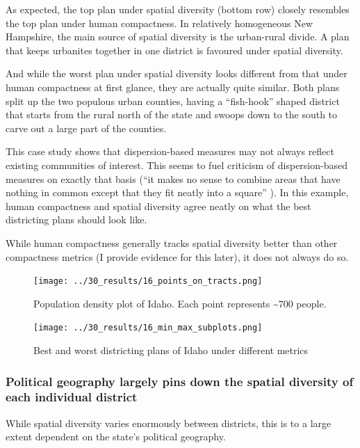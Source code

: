 \documentclass[]{article}
\begin{document}
As expected, the top plan under spatial diversity (bottom row) closely
resembles the top plan under human compactness. In relatively
homogeneous New Hampshire, the main source of spatial diversity is the
urban-rural divide. A plan that keeps urbanites together in one district
is favoured under spatial diversity.

And while the worst plan under spatial diversity looks different from
that under human compactness at first glance, they are actually quite
similar. Both plans split up the two populous urban counties, having a
``fish-hook'' shaped district that starts from the rural north of the
state and swoops down to the south to carve out a large part of the
counties.

This case study shows that dispersion-based measures may not always
reflect existing communities of interest. This seems to fuel criticism
of dispersion-based measures on exactly that basis (``it makes no sense
to combine areas that have nothing in common except that they fit neatly
into a square'' \citep{wolf2015}). In this example, human compactness
and spatial diversity agree neatly on what the best districting plans
should look like.

While human compactness generally tracks spatial diversity better than
other compactness metrics (I provide evidence for this later), it does
not always do so.

\begin{figure}
\centering
\texttt{[image: ../30\_results/16\_points\_on\_tracts.png]}
\caption{Population density plot of Idaho. Each point represents
\textasciitilde{}700 people. \label{idaho_density}}
\end{figure}

\begin{figure}
\centering
\texttt{[image: ../30\_results/16\_min\_max\_subplots.png]}
\caption{Best and worst districting plans of Idaho under different
metrics \label{idaho_minmax}}
\end{figure}

\hypertarget{political-geography-largely-pins-down-the-spatial-diversity-of-each-individual-district}{%
\subsubsection{Political geography largely pins down the spatial
diversity of each individual
district}\label{political-geography-largely-pins-down-the-spatial-diversity-of-each-individual-district}}

While spatial diversity varies enormously between districts, this is to
a large extent dependent on the state's political geography.
\end{document}
